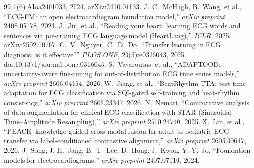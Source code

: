 \begin{thebibliography}{99}
1(6):AIoa2401033, 2024. arXiv:2410.04133.
 J.~C.~McHugh, B.~Wang, et al., ``ECG-FM: an open
electrocardiogram foundation model,'' \emph{arXiv preprint}
2408.05178, 2024.
 J.~Jin, et al., ``Reading your heart: learning
ECG words and sentences via pre-training ECG language model
(HeartLang),'' \emph{ICLR}, 2025. arXiv:2502.10707.
 C.~V.~Nguyen, C.~D.~Do, ``Transfer learning in ECG
diagnosis: is it effective?'' \emph{PLOS ONE}, 20(5):e0316043, 2025.
doi:10.1371/journal.pone.0316043.
 S.~Vavaroutas, et al., ``ADAPTOOD:
uncertainty-aware fine-tuning for out-of-distribution ECG time series
models,'' \emph{arXiv preprint} 2606.04164, 2026.
 W.~Jiang, et al., ``BeatRhythm-TTA: test-time
adaptation for ECG classification via SQI-gated self-training and
beat-rhythm consistency,'' \emph{arXiv preprint} 2608.23347, 2026.
 N.~Nemati, ``Comparative analysis of data
augmentation for clinical ECG classification with STAR (Sinusoidal
Time--Amplitude Resampling),'' \emph{arXiv preprint} 2510.24740, 2025.
 X.~Liu, et al., ``PEACE: knowledge-guided
cross-modal fusion for adult-to-pediatric ECG transfer via
label-conditioned contrastive alignment,'' \emph{arXiv preprint}
2605.00647, 2026.
 J.~Song, J.-H.~Jang, B.~T.~Lee, D.~Hong,
J.~Kwon, Y.-Y.~Jo, ``Foundation models for electrocardiograms,''
\emph{arXiv preprint} 2407.07110, 2024.
\end{thebibliography}
